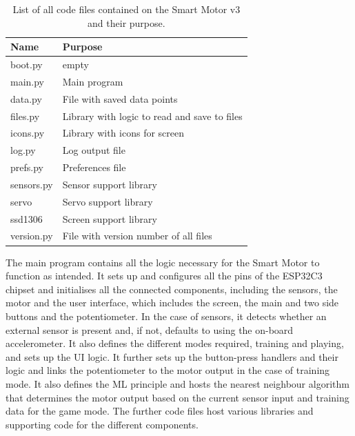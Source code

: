 \begin{table}[H]
    \centering
    \begin{tabular}{|l|l|}
        \hline
        \textbf{Name} & \textbf{Purpose} \\
        \hline
        \hline
        boot.py & empty \\
        \hline
        main.py & Main program \\
        \hline
        \hline
        data.py & File with saved data points \\
        \hline
        files.py & Library with logic to read and save to files \\
        \hline
        icons.py & Library with icons for screen \\
        \hline
        log.py & Log output file \\
        \hline
        prefs.py & Preferences file \\
        \hline
        sensors.py & Sensor support library \\
        \hline
        servo & Servo support library \\
        \hline
        ssd1306 & Screen support library \\
        \hline
        version.py & File with version number of all files \\
        \hline
    \end{tabular}
    \vspace{\ftspace}
    \caption{List of all code files contained on the Smart Motor v3 and their purpose.}
    \label{tab:smv3_code_list}
\end{table}

The main program contains all the logic necessary for the Smart Motor to function as intended. It sets up and configures all the pins of the ESP32C3 chipset and initialises all the connected components, including the sensors, the motor and the user interface, which includes the screen, the main and two side buttons and the potentiometer. In the case of sensors, it detects whether an external sensor is present and, if not, defaults to using the on-board accelerometer. It also defines the different modes required, training and playing, and sets up the UI logic. It further sets up the button-press handlers and their logic and links the potentiometer to the motor output in the case of training mode. It also defines the ML principle and hosts the nearest neighbour algorithm that determines the motor output based on the current sensor input and training data for the game mode.
The further code files host various libraries and supporting code for the different components.

